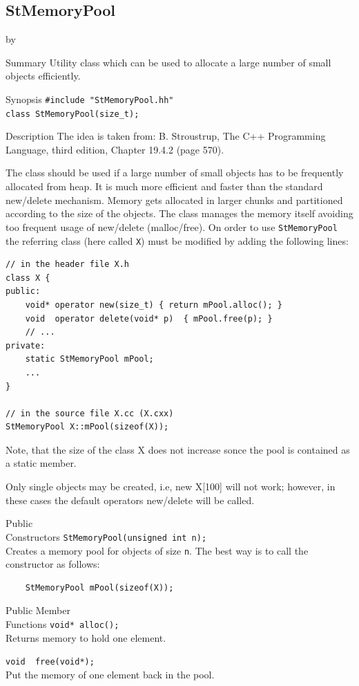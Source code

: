 \documentclass[twoside]{article}
\newcommand{\entrylabel}[1]{\mbox{\textbf{{#1}}}\hfil}%
\newenvironment{entry}
{\begin{list}{}%
    {\renewcommand{\makelabel}{\entrylabel}%
     \setlength{\labelwidth}{90pt}%
     \setlength{\leftmargin}{\labelwidth}
     \advance\leftmargin by \labelsep%
      }%
    }%
  {\end{list}}
\newcommand{\Entrylabel}[1]%
{\raisebox{0pt}[1ex][0pt]{\makebox[\labelwidth][l]%
    {\parbox[t]{\labelwidth}{\hspace{0pt}\textbf{{#1}}}}}}
\newenvironment{Entry}%
{\renewcommand{\entrylabel}{\Entrylabel}\begin{entry}}%
  {\end{entry}}
\begin{document}
\subsection{StMemoryPool}
\label{StMemoryPool}
\begin{Entry}
\item[Summary]
  Utility class which can be used to allocate a large number of
  small objects efficiently.

\item[Synopsis]
    \verb+#include "StMemoryPool.hh"+\\
    \verb+class StMemoryPool(size_t);+
    
\item[Description]   
    The idea is taken from:
    B. Stroustrup, The C++ Programming Language, third edition,
    Chapter 19.4.2 (page 570).

    The class should be used if a large number of small objects
    has to be frequently allocated from heap. It is much more efficient and
    faster than the standard new/delete mechanism.
    Memory gets allocated in larger chunks and partitioned according to
    the size of the objects. The class manages the memory itself avoiding
    too frequent usage of new/delete (malloc/free).
    On order to use \texttt{StMemoryPool} the referring class
    (here called \texttt{X}) must be modified by adding the following lines:
\begin{verbatim}
// in the header file X.h
class X {
public:
    void* operator new(size_t) { return mPool.alloc(); }
    void  operator delete(void* p)  { mPool.free(p); }
    // ...
private:
    static StMemoryPool mPool;
    ...
}

// in the source file X.cc (X.cxx)
StMemoryPool X::mPool(sizeof(X));
\end{verbatim}

Note, that the size of the class X does not increase
sonce the pool is contained as a static member.

Only single objects may be created,
i.e, new X[100] will not work; however, in these cases the
default operators new/delete will be called.


\item[Public\\ Constructors]
    \verb+StMemoryPool(unsigned int n);+\\
    Creates a memory pool for objects of
    size \texttt{n}. The best way is to
    call the constructor as follows:
\begin{verbatim}
    StMemoryPool mPool(sizeof(X));
\end{verbatim}
    
\item[Public Member\\ Functions]
    \verb+void* alloc();+\\
    Returns memory to hold one element.
    
    \verb+void  free(void*);+\\
    Put the memory of one element back in the pool.
\end{Entry}   
\clearpage
\end{document}
